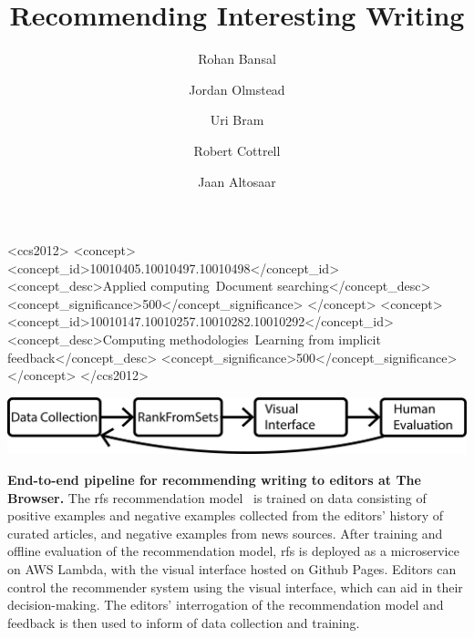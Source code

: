 \documentclass[sigconf]{acmart} %
\title{Recommending Interesting Writing}
\author{Rohan Bansal}
\affiliation{\institution{The Browser}}
\author{Jordan Olmstead}
\affiliation{\institution{The Browser}}
\author{Uri Bram}
\affiliation{\institution{The Browser}}
\author{Robert Cottrell}
\affiliation{\institution{The Browser}}
\author{Jaan Altosaar}
\affiliation{\institution{Princeton University}}
\begin{document}

\begin{CCSXML}
<ccs2012>
   <concept>
       <concept_id>10010405.10010497.10010498</concept_id>
       <concept_desc>Applied computing~Document searching</concept_desc>
       <concept_significance>500</concept_significance>
       </concept>
   <concept>
       <concept_id>10010147.10010257.10010282.10010292</concept_id>
       <concept_desc>Computing methodologies~Learning from implicit feedback</concept_desc>
       <concept_significance>500</concept_significance>
       </concept>
 </ccs2012>
\end{CCSXML}



\begin{teaserfigure}
  \includegraphics[width=\textwidth]{fig/pipeline.pdf}
  \caption{\textbf{End-to-end pipeline for recommending writing to editors at The Browser.} The \acrlong{rfs} recommendation model~\citep{altosaar2020rankfromsets:} is trained on data consisting of positive examples and negative examples collected from the editors' history of curated articles, and negative examples from news sources. After training and offline evaluation of the recommendation model, \acrlong{rfs} is deployed as a microservice on AWS Lambda, with the visual interface hosted on Github Pages. Editors can control the recommender system using the visual interface, which can aid in their decision-making. The editors' interrogation of the recommendation model and feedback is then used to inform of data collection and training.}
  \label{fig:pipeline}
\end{teaserfigure}
\end{document}
